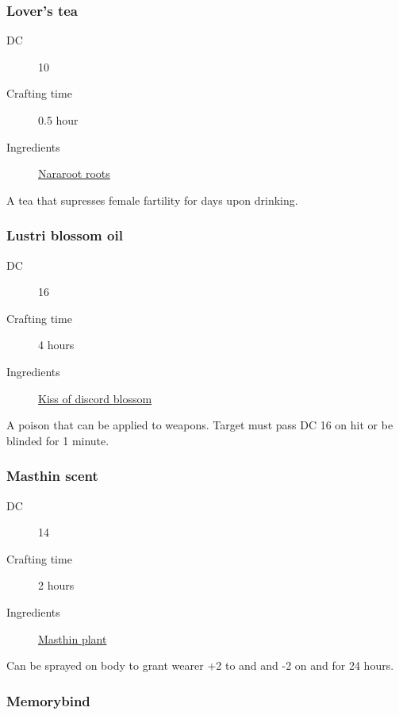 \subsubsection{Lover's tea}
\label{Lover's tea}

\begin{description}
\item [DC] 10 \medicine
\item [Crafting time] 0.5 hour
\item [Ingredients] \hyperref[Nararoot]{Nararoot roots}
\end{description}

A tea that supresses female fartility for  days upon drinking.

\subsubsection{Lustri blossom oil}
\label{Lustri blossom oil}

\begin{description}
\item [DC] 16 \nature
\item [Crafting time] 4 hours
\item [Ingredients] \hyperref[Kiss of Discord]{Kiss of discord blossom}
\end{description}

A poison that can be applied to weapons. Target must pass DC 16 \constitutionsave on hit or be blinded for 1 minute.

\subsubsection{Masthin scent}
\label{Masthin scent}

\begin{description}
\item [DC] 14 \survival
\item [Crafting time] 2 hours
\item [Ingredients] \hyperref[Masthin]{Masthin plant}
\end{description}

Can be sprayed on body to grant wearer +2 to \animalhandling and \intimidation 
and -2 on \persuasion and \performance for 24 hours.

\subsubsection{Memorybind}
\label{Memorybind}

